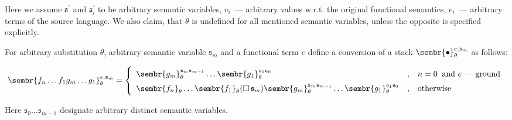 \begin{definition}
Here we assume ${\mathfrak s}^\prime$ and ${\mathfrak s}^\prime_i$ to be arbitrary semantic variables, $v_i$~--- arbitrary values w.r.t. the original 
functional semantics, $e_i$~--- arbitrary terms of the source language. We also claim, that $\theta$ is
undefined for all mentioned semantic variables, unless the opposite is specified explicitly.

\end{definition}

\begin{definition}
\normalfont For arbitrary substitution $\theta$, arbitrary semantic variable ${\mathfrak s}_m$ and a functional 
term $e$ define a conversion of a stack $\sembr{\bullet}^{e,{\mathfrak s}_m}_\theta$ as follows:

$$
\def\arraystretch{1.5}
\sembr{f_n\dots f_1g_m\dots g_1}^{e,{\mathfrak s}_m}_\theta=\left\{
\begin{array}{lcl}
\sembr{g_m}^{{\mathfrak s}_m{\mathfrak s}_{m-1}}_\theta\dots\sembr{g_1}^{{\mathfrak s}_1{\mathfrak s}_0}_\theta&,&n=0\;\;\mbox{and $e$~--- ground}\\
\sembr{f_n}_\theta\dots\sembr{f_1}_\theta(\Box\,{\mathfrak s}_m)\sembr{g_m}^{{\mathfrak s}_m{\mathfrak s}_{m-1}}_\theta\dots\sembr{g_1}^{{\mathfrak s}_1{\mathfrak s}_0}_\theta&,&\mbox{otherwise}
\end{array}
\right.
$$

Here ${\mathfrak s}_0\dots {\mathfrak s}_{m-1}$ designate arbitrary distinct semantic variables.
\end{definition}

